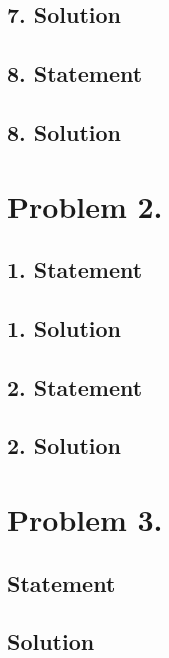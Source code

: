 \subsection{7. Solution}
\subsection{8. Statement}
\subsection{8. Solution}

\section{Problem 2.}
\subsection{1. Statement}
\subsection{1. Solution}
\subsection{2. Statement}
\subsection{2. Solution}

\section{Problem 3.}
\subsection{Statement}
\subsection{Solution}

\EndNoBibArticle
